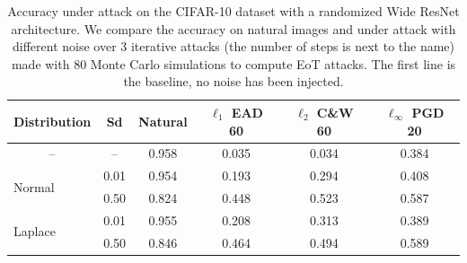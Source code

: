 \begin{table}[t]
  \centering
  \begin{tabular}{lccccc}
    \toprule
    \textbf{Distribution} & \textbf{Sd} & \textbf{Natural} & \textbf{$\ell_1$ EAD 60} & \textbf{$\ell_2$ C\&W 60} & \textbf{$\ell_\infty$ PGD 20} \\
    \midrule
    \multicolumn{1}{c}{--} & -- & 0.958 & 0.035 & 0.034 & 0.384 \\
    \midrule
    \multirow{2}[0]{*}{Normal} & 0.01 & 0.954 & 0.193 & 0.294 & 0.408 \\
	  & 0.50 & 0.824 & 0.448 & 0.523 & 0.587 \\
    \midrule
    \multirow{2}[0]{*}{Laplace} & 0.01 & 0.955 & 0.208 & 0.313 & 0.389 \\
	  & 0.50 & 0.846 & 0.464 & 0.494 & 0.589 \\
    \bottomrule
  \end{tabular}%
  \caption{Accuracy under attack on the CIFAR-10 dataset with a randomized Wide ResNet architecture. We compare the accuracy on natural images and under attack with different noise over 3 iterative attacks (the number of steps is next to the name) made with 80 Monte Carlo simulations to compute EoT attacks. The first line is the baseline, no noise has been injected.}
  \label{table:ap3-accuracy_under_attack}%
\end{table}%



